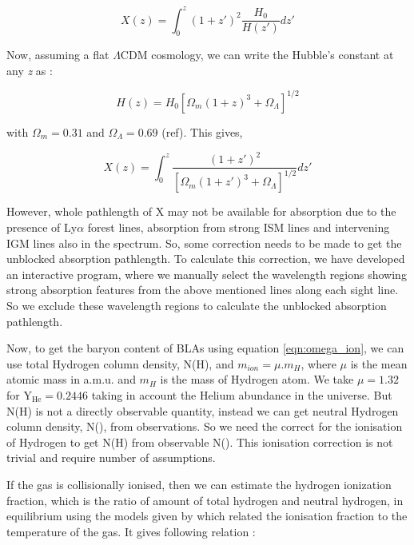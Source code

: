 \begin{equation}
    X(z)=\int_0^z  (1+z')^2 \frac{H_0}{H(z')} dz'
\end{equation}

Now, assuming a flat $\Lambda \text{CDM}$ cosmology, we can write the Hubble's constant at any \emph{z} as :

\begin{equation}
    H(z) = H_0 \left[\Omega_m(1+z)^3+\Omega_\Lambda\right]^{1/2}
\end{equation}

with $\Omega_m=0.31$ and $\Omega_\Lambda=0.69$ (ref). This gives,

\begin{equation}
    X(z)=\int_0^z  \frac{(1+z')^2}{\left[\Omega_m(1+z')^3+\Omega_\Lambda\right]^{1/2}} dz'
\end{equation}

However, whole pathlength of X may not be available for absorption due to the presence of Ly$\alpha$ forest lines, absorption from strong ISM lines and intervening IGM lines also in the spectrum. So, some correction needs to be made to get the unblocked absorption pathlength. To calculate this correction, we have developed an interactive program, where we manually select the wavelength regions showing strong absorption features from the above mentioned lines along each sight line. So we exclude these wavelength regions to calculate the unblocked absorption pathlength.

Now, to get the baryon content of BLAs using equation \ref{eqn:omega_ion}, we can use total Hydrogen column density, N(H), and $m_{ion}=\mu . m_H$, where $\mu$ is the mean atomic mass in a.m.u. and $m_H$ is the mass of Hydrogen atom. We take $\mu=1.32$ for $\text{Y}_\text{He}=0.2446$ \citep{Peimbert-2016} taking in account the Helium abundance in the universe. But N(H) is not a directly observable quantity, instead we can get neutral Hydrogen column density, N(), from observations. So we need the correct for the ionisation of Hydrogen to get N(H) from observable N(). This ionisation correction is not trivial and require number of assumptions.

If the gas is collisionally ionised, then we can estimate the hydrogen ionization fraction, which is the ratio of amount of total hydrogen and neutral hydrogen, in equilibrium using the models given by \citet{Sutherland-1993} which related the ionisation fraction to the temperature of the gas. It gives following relation :

